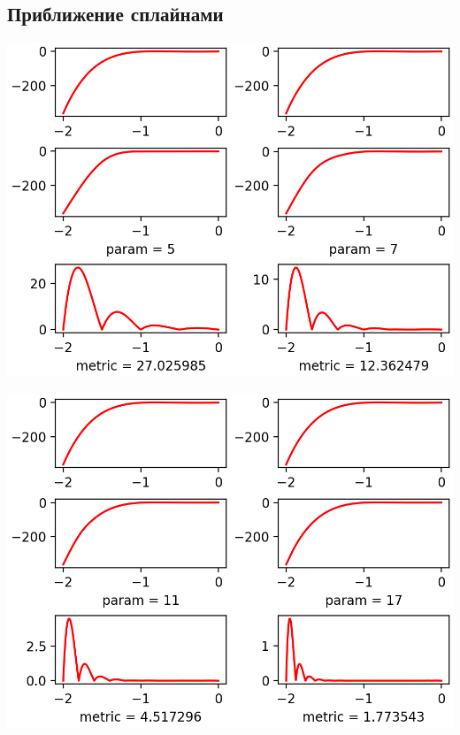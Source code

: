 \documentclass{article}
\begin{document}
\subsection{Приближение сплайнами}
\begin{Center}
\includegraphics{F1_p5p7_Splain.png}

\includegraphics{F1_p11p17_Splain.png}


\end{Center}
\end{document}
